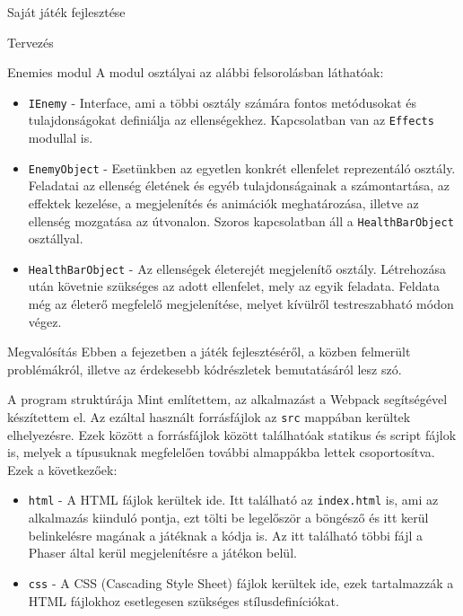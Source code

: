 \begin{MyChapter}{Saját játék fejlesztése}
\begin{MySection}{Tervezés}
\begin{MySubSection}{Enemies modul}
			A modul osztályai az alábbi felsorolásban láthatóak:
			\begin{itemize}			
				\item \texttt{IEnemy} - Interface, ami a többi osztály számára fontos metódusokat és tulajdonságokat definiálja az ellenségekhez. Kapcsolatban van az \texttt{Effects} modullal is.
				
				\item \texttt{EnemyObject} - Esetünkben az egyetlen konkrét ellenfelet reprezentáló osztály. Feladatai az ellenség életének és egyéb tulajdonságainak a számontartása, az effektek kezelése, a megjelenítés és animációk meghatározása, illetve az ellenség mozgatása az útvonalon. Szoros kapcsolatban áll a \texttt{HealthBarObject} osztállyal.
				
				\item \texttt{HealthBarObject} - Az ellenségek életerejét megjelenítő osztály. Létrehozása után követnie szükséges az adott ellenfelet, mely az egyik feladata. Feldata még az életerő megfelelő megjelenítése, melyet kívülről testreszabható módon végez.
				
			\end{itemize}
		\end{MySubSection}

	\end{MySection}
	
	\begin{MySection}{Megvalósítás}	
		Ebben a fejezetben a játék fejlesztéséről, a közben felmerült problémákról, illetve az érdekesebb kódrészletek bemutatásáról lesz szó.
		
		\begin{MySubSection}{A program struktúrája}
			Mint említettem, az alkalmazást a Webpack segítségével készítettem el. Az ezáltal használt forrásfájlok az \texttt{src} mappában kerültek elhelyezésre. Ezek között a forrásfájlok között találhatóak statikus és script fájlok is, melyek a típusuknak megfelelően további almappákba lettek csoportosítva.
			Ezek a következőek:
			
			\begin{itemize}
				\item \texttt{html} - A HTML fájlok kerültek ide. Itt található az \texttt{index.html} is, ami az alkalmazás kiinduló pontja, ezt tölti be legelőször a böngésző és itt kerül belinkelésre magának a játéknak a kódja is. Az itt található többi fájl a Phaser által kerül megjelenítésre a játékon belül.
				
				\item \texttt{css} - A CSS (Cascading Style Sheet) fájlok kerültek ide, ezek tartalmazzák a HTML fájlokhoz esetlegesen szükséges stílusdefiníciókat.
				

\end{itemize}
\end{MySubSection}
\end{MySection}
\end{MyChapter}
